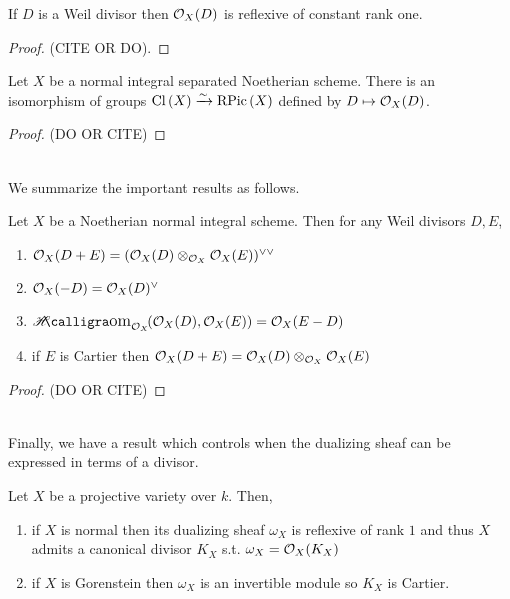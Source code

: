 \documentclass[12pt]{article}
\begin{document}
\begin{prop}
If $D$ is a Weil divisor then $\mathcal{O}_{X}(D)$ is reflexive of constant rank one. 
\end{prop}

\begin{proof}
(CITE OR DO).
\end{proof}

\begin{theorem} 
Let $X$ be a normal integral separated Noetherian scheme. There is an isomorphism of groups $\mathrm{Cl} \left( X \right) \xrightarrow{\sim} \mathrm{RPic}\left( X \right)$ defined by $D \mapsto \mathcal{O}_{X}(D)$.
\end{theorem}

\begin{proof}
(DO OR CITE)
\end{proof}
\noindent\\
We summarize the important results as follows.
\begin{theorem} \label{properties_of_reflexive_sheaves}
Let $X$ be a Noetherian normal integral scheme. Then for any Weil divisors $D, E$,
\begin{enumerate}
\item $\mathcal{O}_{X}(D + E) = (\mathcal{O}_{X}(D) \otimes_{\mathcal{O}_{X}} \mathcal{O}_{X}(E))^{\vee \vee}$
\item $\mathcal{O}_{X}(-D) = \mathcal{O}_{X}(D)^\vee$
\item $\shHom{\struct{X}}{\struct{X}(D)}{\struct{X}(E)} = \struct{X}(E - D)$
\item if $E$ is Cartier then $\mathcal{O}_{X}(D + E) = \mathcal{O}_{X}(D) \otimes_{\mathcal{O}_{X}} \mathcal{O}_{X}(E)$
\end{enumerate}
\begin{center}

\begin{proof}
(DO OR CITE)
\end{proof}

\end{center}
\end{theorem}
\noindent\\
Finally, we have a result which controls when the dualizing sheaf can be expressed in terms of a divisor.
\begin{prop}
Let $X$ be a projective variety over $k$. Then,
\begin{enumerate}
\item if $X$ is normal then its dualizing sheaf $\omega_X$ is reflexive of rank $1$ and thus $X$ admits a canonical divisor $K_X$ s.t. $\omega_X = \mathcal{O}_{X}(K_X)$
\item if $X$ is Gorenstein then $\omega_X$ is an invertible module so $K_X$ is Cartier.
\end{enumerate}
\end{prop}
\end{document}
